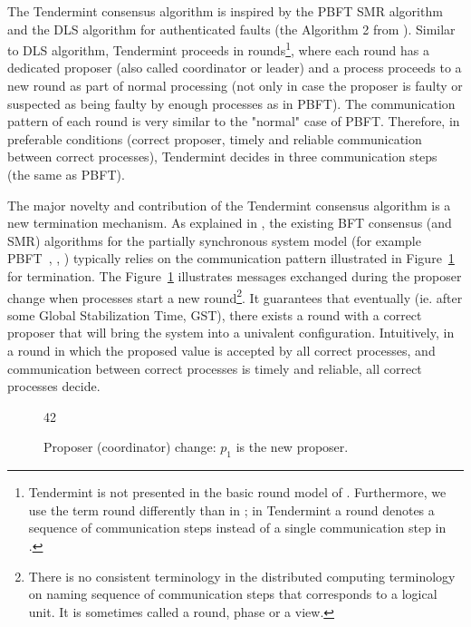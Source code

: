 The Tendermint consensus algorithm is inspired by the PBFT SMR
algorithm~\cite{CL99:osdi} and the DLS algorithm for authenticated faults (the
Algorithm 2 from \cite{DLS88:jacm}). Similar to DLS algorithm, Tendermint
proceeds in
rounds\footnote{Tendermint is not presented in the basic round model of
	\cite{DLS88:jacm}. Furthermore, we use the term round differently than in
	\cite{DLS88:jacm}; in Tendermint a round denotes a sequence of communication
	steps instead of a single communication step in \cite{DLS88:jacm}.}, where each
round has a dedicated proposer (also called coordinator or
leader) and a process proceeds to a new round as part of normal
processing (not only in case the proposer is faulty or suspected as being faulty
by enough processes as in PBFT).
The communication pattern of each round is very similar to the "normal" case
of PBFT. Therefore, in preferable conditions (correct proposer, timely and
reliable communication between correct processes), Tendermint decides in three
communication steps (the same as PBFT).

The major novelty and contribution of the Tendermint consensus algorithm is a
new termination mechanism. As explained in \cite{MHS09:opodis, RMS10:dsn}, the
existing BFT consensus (and SMR) algorithms for the partially synchronous
system model (for example PBFT~\cite{CL99:osdi}, \cite{DLS88:jacm},
\cite{MA06:tdsc}) typically relies on the communication pattern illustrated in
Figure~\ref{ch3:fig:coordinator-change} for termination. The
Figure~\ref{ch3:fig:coordinator-change} illustrates messages exchanged during
the proposer change when processes start a new round\footnote{There is no
	consistent terminology in the distributed computing terminology on naming
	sequence of communication steps that corresponds to a logical unit. It is
	sometimes called a round, phase or a view.}. It guarantees that eventually (ie.
after some Global Stabilization Time, GST), there exists a round with a correct
proposer that will bring the system into a univalent configuration.
Intuitively, in a round in which the proposed value is accepted
by all correct processes, and communication between correct processes is
timely and reliable, all correct processes decide.


\begin{figure}[tbh!] \def\rdstretch{5} \def\ystretch{3} \centering
	\begin{rounddiag}{4}{2}  
		  
		 
		   \end{rounddiag}
	\vspace{-5mm} \caption{\boldmath Proposer (coordinator) change: $p_1$ is the
		new proposer.} \label{ch3:fig:coordinator-change} \end{figure}

